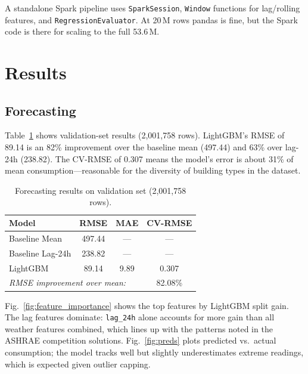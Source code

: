 \documentclass[conference]{IEEEtran}
\begin{document}
A standalone Spark pipeline uses \texttt{SparkSession}, \texttt{Window} functions for lag/rolling features, and \texttt{RegressionEvaluator}. At 20\,M rows pandas is fine, but the Spark code is there for scaling to the full 53.6\,M.

\section{Results}

\subsection{Forecasting}

Table~\ref{tab:model_results} shows validation-set results (2,001,758 rows). LightGBM's RMSE of 89.14 is an 82\% improvement over the baseline mean (497.44) and 63\% over lag-24h (238.82). The CV-RMSE of 0.307 means the model's error is about 31\% of mean consumption---reasonable for the diversity of building types in the dataset.

\begin{table}[t]
\centering
\caption{Forecasting results on validation set (2,001,758 rows).}
\label{tab:model_results}
\begin{tabular}{@{}lccc@{}}
\toprule
\textbf{Model} & \textbf{RMSE} & \textbf{MAE} & \textbf{CV-RMSE} \\
\midrule
Baseline Mean     & 497.44 & ---   & --- \\
Baseline Lag-24h  & 238.82 & ---   & --- \\
LightGBM          & 89.14  & 9.89  & 0.307 \\
\midrule
\multicolumn{3}{l}{\textit{RMSE improvement over mean:}} & 82.08\% \\
\bottomrule
\end{tabular}
\end{table}

Fig.~\ref{fig:feature_importance} shows the top features by LightGBM split gain. The lag features dominate: \texttt{lag\_24h} alone accounts for more gain than all weather features combined, which lines up with the patterns noted in the ASHRAE competition solutions. Fig.~\ref{fig:preds} plots predicted vs.\ actual consumption; the model tracks well but slightly underestimates extreme readings, which is expected given outlier capping.
\end{document}
